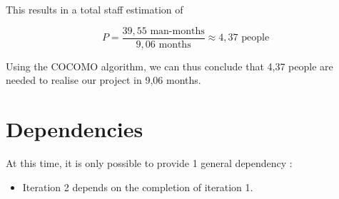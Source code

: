 \documentclass[salesmen, twoside]{../../../templates/latex/2009/softproj}
\begin{document}
\begin{projdoc}
			This results in a total staff estimation of
			
				\[ P = \frac{39,55 \textrm{ man-months}}{9,06 \textrm{ months}} \approx 4,37 \textrm{ people} \]
			
			Using the COCOMO algorithm, we can thus conclude that 4,37 people are needed to
			realise our project in 9,06 months. 
			
			\section {Dependencies}
			
			At this time, it is only possible to provide 1 general dependency :
			
			\begin{itemize}
				
				\item Iteration 2 depends on the completion of iteration 1.
				
			\end{itemize}
			
			

\end{projdoc}
\end{document}

